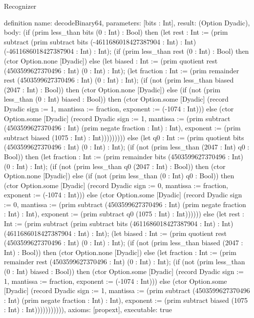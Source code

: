 \begin{lexlean}{Recognizer}
\begin{semanticmodule}
definition{
  name: decodeBinary64,
  parameters: [bits : Int],
  result: (Option Dyadic),
  body: (if (prim less_than bits (0 : Int) : Bool) then (let rest : Int := (prim subtract (prim subtract bits (-4611686018427387904 : Int) : Int) (-4611686018427387904 : Int) : Int); (if (prim less_than rest (0 : Int) : Bool) then (ctor Option.none [Dyadic]) else (let biased : Int := (prim quotient rest (4503599627370496 : Int) (0 : Int) : Int); (let fraction : Int := (prim remainder rest (4503599627370496 : Int) (0 : Int) : Int); (if (not (prim less_than biased (2047 : Int) : Bool)) then (ctor Option.none [Dyadic]) else (if (not (prim less_than (0 : Int) biased : Bool)) then (ctor Option.some [Dyadic] (record Dyadic {sign := 1, mantissa := fraction, exponent := (-1074 : Int)})) else (ctor Option.some [Dyadic] (record Dyadic {sign := 1, mantissa := (prim subtract (4503599627370496 : Int) (prim negate fraction : Int) : Int), exponent := (prim subtract biased (1075 : Int) : Int)})))))))) else (let q0 : Int := (prim quotient bits (4503599627370496 : Int) (0 : Int) : Int); (if (not (prim less_than (2047 : Int) q0 : Bool)) then (let fraction : Int := (prim remainder bits (4503599627370496 : Int) (0 : Int) : Int); (if (not (prim less_than q0 (2047 : Int) : Bool)) then (ctor Option.none [Dyadic]) else (if (not (prim less_than (0 : Int) q0 : Bool)) then (ctor Option.some [Dyadic] (record Dyadic {sign := 0, mantissa := fraction, exponent := (-1074 : Int)})) else (ctor Option.some [Dyadic] (record Dyadic {sign := 0, mantissa := (prim subtract (4503599627370496 : Int) (prim negate fraction : Int) : Int), exponent := (prim subtract q0 (1075 : Int) : Int)}))))) else (let rest : Int := (prim subtract (prim subtract bits (4611686018427387904 : Int) : Int) (4611686018427387904 : Int) : Int); (let biased : Int := (prim quotient rest (4503599627370496 : Int) (0 : Int) : Int); (if (not (prim less_than biased (2047 : Int) : Bool)) then (ctor Option.none [Dyadic]) else (let fraction : Int := (prim remainder rest (4503599627370496 : Int) (0 : Int) : Int); (if (not (prim less_than (0 : Int) biased : Bool)) then (ctor Option.some [Dyadic] (record Dyadic {sign := 1, mantissa := fraction, exponent := (-1074 : Int)})) else (ctor Option.some [Dyadic] (record Dyadic {sign := 1, mantissa := (prim subtract (4503599627370496 : Int) (prim negate fraction : Int) : Int), exponent := (prim subtract biased (1075 : Int) : Int)})))))))))),
  axioms: [propext],
  executable: true
}


\end{semanticmodule}
\end{lexlean}
